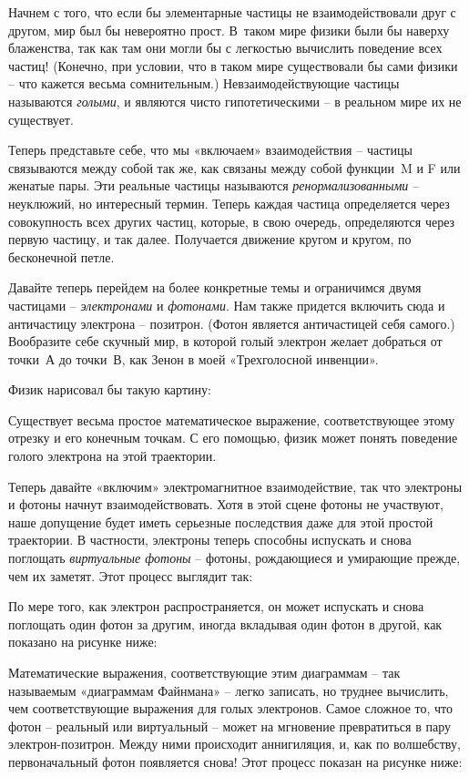 \documentclass[../main.tex]{subfiles}
\begin{document}
Начнем с того, что если бы элементарные частицы не взаимодействовали друг с другом, мир был бы невероятно прост. В~таком мире физики были бы наверху блаженства, так как там они могли бы с легкостью вычислить поведение всех частиц! (Конечно, при условии, что в таком мире существовали бы сами физики \--- что кажется весьма сомнительным.) Невзаимодействующие частицы называются \emph{голыми}, и являются чисто гипотетическими \--- в реальном мире их не существует.

Теперь представьте себе, что мы «включаем» взаимодействия \--- частицы связываются между собой так же, как связаны между собой функции~M и F или женатые пары. Эти реальные частицы называются \emph{ренормализованными} \--- неуклюжий, но интересный термин. Теперь каждая частица определяется через совокупность всех других частиц, которые, в свою очередь, определяются через первую частицу, и так далее. Получается движение кругом и кругом, по бесконечной петле.

Давайте теперь перейдем на более конкретные темы и ограничимся двумя частицами \--- \emph{электронами} и \emph{фотонами}. Нам также придется включить сюда и античастицу электрона \--- позитрон. (Фотон является античастицей себя самого.) Вообразите себе скучный мир, в которой голый электрон желает добраться от точки~А до точки~В, как Зенон в моей «Трехголосной инвенции».

Физик нарисовал бы такую картину:

Существует весьма простое математическое выражение, соответствующее этому отрезку и его конечным точкам. С его помощью, физик может понять поведение голого электрона на этой траектории.

Теперь давайте «включим» электромагнитное взаимодействие, так что электроны и фотоны начнут взаимодействовать. Хотя в этой сцене фотоны не участвуют, наше допущение будет иметь серьезные последствия даже для этой простой траектории. В частности, электроны теперь способны испускать и снова поглощать \emph{виртуальные фотоны} \--- фотоны, рождающиеся и умирающие прежде, чем их заметят. Этот процесс выглядит так:

По мере того, как электрон распространяется, он может испускать и снова поглощать один фотон за другим, иногда вкладывая один фотон в другой, как показано на рисунке ниже:

Математические выражения, соответствующие этим диаграммам \--- так называемым «диаграммам Файнмана» \--- легко записать, но труднее вычислить, чем соответствующие выражения для голых электронов. Самое сложное то, что фотон \--- реальный или виртуальный \--- может на мгновение превратиться в пару электрон-позитрон. Между ними происходит аннигиляция, и, как по волшебству, первоначальный фотон появляется снова! Этот процесс показан на рисунке ниже:
\end{document}
